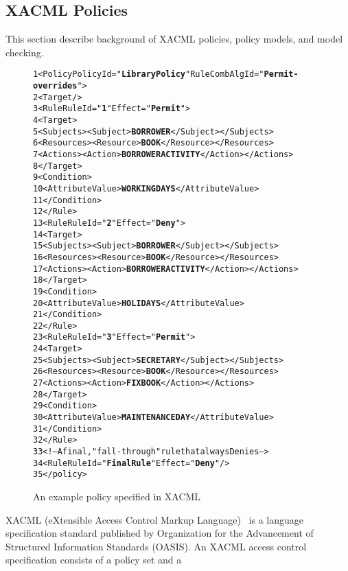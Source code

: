 \subsection{XACML Policies}
This section describe background of XACML policies, policy models, and model checking.
\begin{figure}[t]%
\begin{CodeOut}
\begin{alltt}
 1 <Policy PolicyId="\textbf{Library Policy}" RuleCombAlgId="\textbf{Permit-overrides}">
 2  <Target/>
 3    <Rule RuleId="\textbf{1}" Effect="\textbf{Permit}">
 4      <Target>
 5        <Subjects><Subject> \textbf{BORROWER} </Subject></Subjects>
 6        <Resources><Resource> \textbf{BOOK} </Resource></Resources>
 7        <Actions><Action> \textbf{BORROWERACTIVITY} </Action></Actions>
 8      </Target>
 9	    <Condition>
10        <AttributeValue> \textbf{WORKINGDAYS} </AttributeValue>
11      </Condition>
12    </Rule>
13    <Rule RuleId="\textbf{2}" Effect="\textbf{Deny}">
14      <Target>
15        <Subjects><Subject> \textbf{BORROWER} </Subject></Subjects>
16        <Resources><Resource> \textbf{BOOK} </Resource></Resources>
17        <Actions><Action> \textbf{BORROWERACTIVITY} </Action></Actions>
18      </Target>
19	    <Condition>
20        <AttributeValue> \textbf{HOLIDAYS} </AttributeValue>
21      </Condition>
22    </Rule>
23    <Rule RuleId="\textbf{3}" Effect="\textbf{Permit}">
24      <Target>
25        <Subjects><Subject> \textbf{SECRETARY} </Subject></Subjects>
26        <Resources><Resource> \textbf{BOOK} </Resource></Resources>
27        <Actions><Action> \textbf{FIXBOOK} </Action></Actions>
28      </Target>
29	    <Condition>
30        <AttributeValue> \textbf{MAINTENANCEDAY} </AttributeValue>
31      </Condition>
32    </Rule>
33      <!-- A final, "fall-through" rule that always Denies -->
34    <Rule RuleId="\textbf{FinalRule}" Effect="\textbf{Deny}"/>
35 </policy>
\end{alltt}
\end{CodeOut}
\vspace*{-3.0ex} \caption{An example policy specified in XACML}
 \label{fig:example}
\end{figure}
XACML (eXtensible Access Control Markup
Language)~\cite{oasis05:xacml} is a language specification standard
published by Organization for the Advancement of Structured
Information Standards (OASIS).
An XACML access control specification consists of a policy set and a
